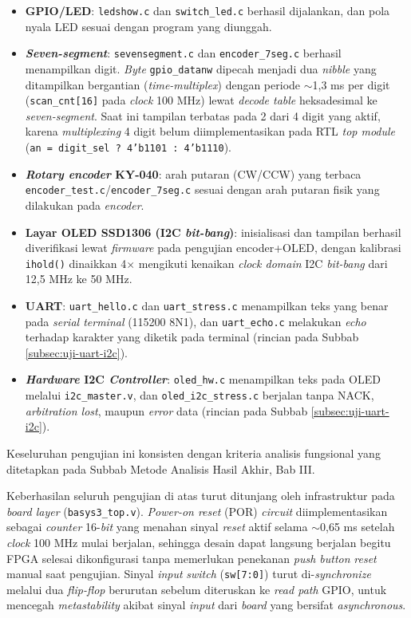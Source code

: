 \begin{itemize}
	\item \textbf{GPIO/LED}: \texttt{ledshow.c} dan \texttt{switch\_led.c} berhasil dijalankan, dan pola nyala LED sesuai dengan program yang diunggah.
	\item \textbf{\textit{Seven-segment}}: \texttt{sevensegment.c} dan \texttt{encoder\_7seg.c} berhasil menampilkan digit. \textit{Byte} \texttt{gpio\_datanw} dipecah menjadi dua \textit{nibble} yang ditampilkan bergantian (\textit{time-multiplex}) dengan periode $\sim$1,3 ms per digit (\texttt{scan\_cnt[16]} pada \textit{clock} 100 MHz) lewat \textit{decode table} heksadesimal ke \textit{seven-segment}. Saat ini tampilan terbatas pada 2 dari 4 digit yang aktif, karena \textit{multiplexing} 4 digit belum diimplementasikan pada RTL \textit{top module} (\texttt{an = digit\_sel ? 4'b1101 : 4'b1110}).
	\item \textbf{\textit{Rotary encoder} KY-040}: arah putaran (CW/CCW) yang terbaca \texttt{encoder\_test.c}/\texttt{encoder\_7seg.c} sesuai dengan arah putaran fisik yang dilakukan pada \textit{encoder}.
	\item \textbf{Layar OLED SSD1306 (I2C \textit{bit-bang})}: inisialisasi dan tampilan berhasil diverifikasi lewat \textit{firmware} pada pengujian encoder+OLED, dengan kalibrasi \texttt{ihold()} dinaikkan 4$\times$ mengikuti kenaikan \textit{clock domain} I2C \textit{bit-bang} dari 12,5 MHz ke 50 MHz.
	\item \textbf{UART}: \texttt{uart\_hello.c} dan \texttt{uart\_stress.c} menampilkan teks yang benar pada \textit{serial terminal} (115200 8N1), dan \texttt{uart\_echo.c} melakukan \textit{echo} terhadap karakter yang diketik pada terminal (rincian pada Subbab \ref{subsec:uji-uart-i2c}).
	\item \textbf{\textit{Hardware} I2C \textit{Controller}}: \texttt{oled\_hw.c} menampilkan teks pada OLED melalui \texttt{i2c\_master.v}, dan \texttt{oled\_i2c\_stress.c} berjalan tanpa NACK, \textit{arbitration lost}, maupun \textit{error} data (rincian pada Subbab \ref{subsec:uji-uart-i2c}).
\end{itemize}

Keseluruhan pengujian ini konsisten dengan kriteria analisis fungsional yang ditetapkan pada Subbab Metode Analisis Hasil Akhir, Bab III.

Keberhasilan seluruh pengujian di atas turut ditunjang oleh infrastruktur pada \textit{board layer} (\texttt{basys3\_top.v}). \textit{Power-on reset} (POR) \textit{circuit} diimplementasikan sebagai \textit{counter} 16-\textit{bit} yang menahan sinyal \textit{reset} aktif selama $\sim$0,65 ms setelah \textit{clock} 100 MHz mulai berjalan, sehingga desain dapat langsung berjalan begitu FPGA selesai dikonfigurasi tanpa memerlukan penekanan \textit{push button} \textit{reset} manual saat pengujian. Sinyal \textit{input} \textit{switch} (\texttt{sw[7:0]}) turut di-\textit{synchronize} melalui dua \textit{flip-flop} berurutan sebelum diteruskan ke \textit{read path} GPIO, untuk mencegah \textit{metastability} akibat sinyal \textit{input} dari \textit{board} yang bersifat \textit{asynchronous}.

